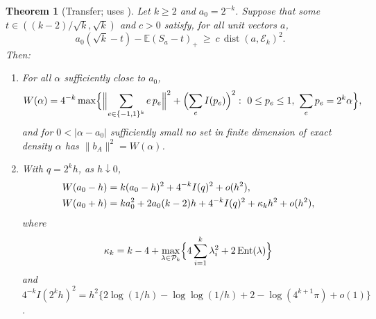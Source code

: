 \documentclass[11pt,a4paper]{article}
\numberwithin{equation}{section}
\newtheorem{theorem}{Theorem}[section]
\theoremstyle{remark}
\newcommand{\E}{\mathbb E}
\newcommand{\dist}{\operatorname{dist}}
\newcommand{\Ent}{\operatorname{Ent}}
\begin{document}
\begin{theorem}[Transfer; uses \cite{YuLevel}]\label{thm:faces}
Let $k\ge2$ and $a_0=2^{-k}$. Suppose that some
$t\in((k-2)/\sqrt k,\sqrt k)$ and $c>0$ satisfy, for all unit vectors $a$,
\begin{equation}\label{eq:exposed}
 a_0(\sqrt k-t)-\E(S_a-t)_+\ \ge\ c\,\dist(a,\mathcal E_k)^2 .
\end{equation}
Then:
\begin{enumerate}[label=(\roman*)]
\item For all $\alpha$ sufficiently close to $a_0$,
\begin{equation}\label{eq:k-fibres}
 W(\alpha)=4^{-k}\max\Bigl\{\Bigl\|\sum_{e\in\{-1,1\}^k}e\,p_e\Bigr\|^2
 +\Bigl(\sum_eI(p_e)\Bigr)^2:\ 0\le p_e\le1,\ \sum_ep_e=2^k\alpha\Bigr\},
\end{equation}
and for $0<|\alpha-a_0|$ sufficiently small no set in finite dimension of
exact density $\alpha$ has $\|b_A\|^2=W(\alpha)$.
\item With $q=2^kh$, as $h\downarrow0$,
\begin{align}
 W(a_0-h)&=k(a_0-h)^2+4^{-k}I(q)^2+o(h^2),\notag\\
 W(a_0+h)&=ka_0^2+2a_0(k-2)h+4^{-k}I(q)^2+\kappa_kh^2+o(h^2),\label{eq:k-constant}
\end{align}
where
\[
 \kappa_k=k-4+\max_{\lambda\in\mathcal P_k}\Bigl\{4\sum_{i=1}^k\lambda_i^2+2\Ent(\lambda)\Bigr\}
\]
and $4^{-k}I(2^kh)^2=h^2\{2\log(1/h)-\log\log(1/h)+2-\log(4^{k+1}\pi)+o(1)\}$.
\end{enumerate}
\end{theorem}
\end{document}
